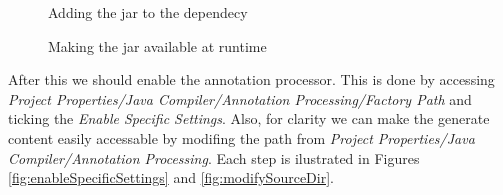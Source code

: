        \begin{figure}
             \centering
             \caption{Adding the jar to the dependecy}
             \label{fig:addJar}
        \end{figure}    

        \begin{figure}
             \centering
             \caption{Making the jar available at runtime}
             \label{fig:makeAvailable}
        \end{figure}    


        After this we should enable the annotation processor. This is done by accessing \textit{Project Properties/Java Compiler/Annotation Processing/Factory Path} and ticking the \textit{Enable Specific Settings}.
Also, for clarity we can make the generate content easily accessable by modifing the path from \textit{Project Properties/Java Compiler/Annotation Processing}. Each step is ilustrated in 
Figures \ref{fig:enableSpecificSettings} and \ref{fig:modifySourceDir}.


